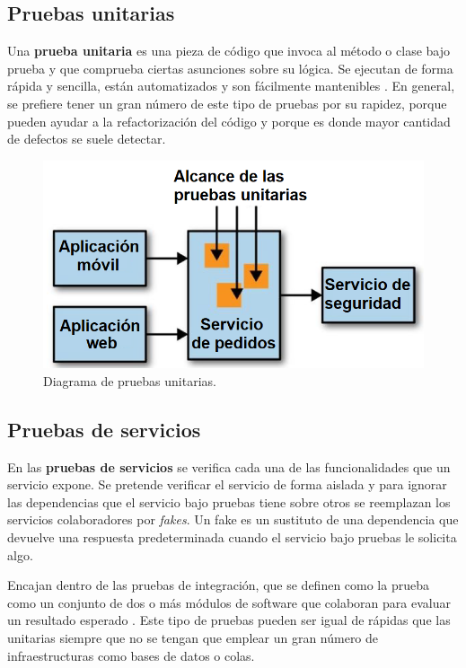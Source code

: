 \documentclass[11pt,spanish,listoffigures]{tfgetsinf}
\begin{document}
\subsection{Pruebas unitarias}

Una \textbf{prueba unitaria} es una pieza de código que invoca al método o clase bajo prueba y que comprueba ciertas asunciones sobre su lógica. Se ejecutan de forma rápida y sencilla, están automatizados y son fácilmente mantenibles \cite{Osherove2014}. En general, se prefiere tener un gran número de este tipo de pruebas por su rapidez, porque pueden ayudar a la refactorización del código y porque es donde mayor cantidad de defectos se suele detectar.

\begin{figure}[h]
\centering
\includegraphics[scale=0.5]{Unit_Tests_ES}
\caption{Diagrama de pruebas unitarias.}
\end{figure}

\subsection{Pruebas de servicios}

En las \textbf{pruebas de servicios} se verifica cada una de las funcionalidades que un servicio expone. Se pretende verificar el servicio de forma aislada y para ignorar las dependencias que el servicio bajo pruebas tiene sobre otros se reemplazan los servicios colaboradores por \textit{fakes}. Un fake es un sustituto  de una dependencia que devuelve una respuesta predeterminada cuando el servicio bajo pruebas le solicita algo.

Encajan dentro de las pruebas de integración, que se definen como la prueba como un conjunto de dos o más módulos de software que colaboran para evaluar un resultado esperado \cite{Osherove2014}. Este tipo de pruebas pueden ser igual de rápidas que las unitarias siempre que no se tengan que emplear un gran número de infraestructuras como bases de datos o colas.
\end{document}
